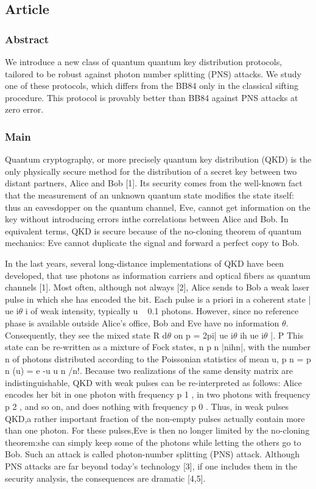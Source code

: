 \subsection{Article}

\subsubsection*{Abstract}

We introduce a new class of quantum quantum key distribution protocols, tailored to be robust against photon number splitting (PNS) attacks. We study one of these protocols, which differs from the BB84 only in the classical sifting procedure. This protocol is provably better than BB84 against PNS attacks at zero error.


\subsubsection*{Main}
Quantum cryptography, or more precisely quantum key distribution (QKD) is the only physically secure method for the distribution of a secret key between two distant partners, Alice and Bob [1]. Its security comes from the well-known fact that the measurement of an unknown quantum state modifies the state itself: thus an eavesdopper on the quantum channel, Eve, cannot get information on the key without introducing errors inthe correlations between Alice and Bob. In equivalent terms, QKD is secure because of the no-cloning theorem of quantum mechanics: Eve cannot duplicate the signal and forward a perfect copy to Bob.

In the last years, several long-distance implementations of QKD have been developed, that use photons as information carriers and optical fibers as quantum channels [1]. Most often, although not always [2], Alice sends to Bob a weak laser pulse in which she has encoded the bit. Each pulse is a priori in a coherent state | ue i$\theta$ i of weak intensity, typically u ~ 0.1 photons. However, since no reference phase is available outside Alice’s office, Bob and Eve have no information $\theta$. Consequently, they see the mixed state R d$\theta$ on p = 2pi| ue i$\theta$ ih ue i$\theta$ |. P This state can be re-written as a mixture of Fock states, n p n |nihn|, with the number n of photons distributed according to the Poissonian statistics of mean u, p n = p n (u) = e -u u n /n!. Because two realizations of the same density matrix are indistinguishable, QKD with weak pulses can be re-interpreted as follows: Alice encodes her bit in one photon with frequency p 1 , in two photons with frequency p 2 , and so on, and does nothing with frequency p 0 . Thus, in weak pulses QKD,a rather important fraction of the non-empty pulses actually contain more than one photon. For these pulses,Eve is then no longer limited by the no-cloning theorem:she can simply keep some of the photons while letting the others go to Bob. Such an attack is called photon-number splitting (PNS) attack. Although PNS attacks are far beyond today’s technology [3], if one includes them in the security analysis, the consequences are dramatic [4,5].

